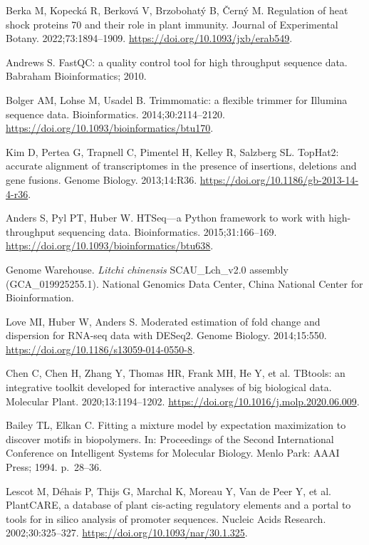 \documentclass[referee,pdflatex,sn-basic,Numbered]{sn-jnl}
\begin{document}
\begin{enumerate}[label={[\arabic*]},itemsep=2pt,leftmargin=2.6em]
\item Berka M, Kopeck\'a R, Berkov\'a V, Brzobohat\'y B, \v{C}ern\'y M. Regulation of heat shock proteins 70 and their role in plant immunity. Journal of Experimental Botany. 2022;73:1894--1909. \url{https://doi.org/10.1093/jxb/erab549}.

\item Andrews S. FastQC: a quality control tool for high throughput sequence data. Babraham Bioinformatics; 2010.

\item Bolger AM, Lohse M, Usadel B. Trimmomatic: a flexible trimmer for Illumina sequence data. Bioinformatics. 2014;30:2114--2120. \url{https://doi.org/10.1093/bioinformatics/btu170}.

\item Kim D, Pertea G, Trapnell C, Pimentel H, Kelley R, Salzberg SL. TopHat2: accurate alignment of transcriptomes in the presence of insertions, deletions and gene fusions. Genome Biology. 2013;14:R36. \url{https://doi.org/10.1186/gb-2013-14-4-r36}.

\item Anders S, Pyl PT, Huber W. HTSeq---a Python framework to work with high-throughput sequencing data. Bioinformatics. 2015;31:166--169. \url{https://doi.org/10.1093/bioinformatics/btu638}.

\item Genome Warehouse. \textit{Litchi chinensis} SCAU\_Lch\_v2.0 assembly (GCA\_019925255.1). National Genomics Data Center, China National Center for Bioinformation.

\item Love MI, Huber W, Anders S. Moderated estimation of fold change and dispersion for RNA-seq data with DESeq2. Genome Biology. 2014;15:550. \url{https://doi.org/10.1186/s13059-014-0550-8}.

\item Chen C, Chen H, Zhang Y, Thomas HR, Frank MH, He Y, et al. TBtools: an integrative toolkit developed for interactive analyses of big biological data. Molecular Plant. 2020;13:1194--1202. \url{https://doi.org/10.1016/j.molp.2020.06.009}.

\item Bailey TL, Elkan C. Fitting a mixture model by expectation maximization to discover motifs in biopolymers. In: Proceedings of the Second International Conference on Intelligent Systems for Molecular Biology. Menlo Park: AAAI Press; 1994. p.~28--36.

\item Lescot M, D\'ehais P, Thijs G, Marchal K, Moreau Y, Van de Peer Y, et al. PlantCARE, a database of plant cis-acting regulatory elements and a portal to tools for in silico analysis of promoter sequences. Nucleic Acids Research. 2002;30:325--327. \url{https://doi.org/10.1093/nar/30.1.325}.


\end{enumerate}
\end{document}
